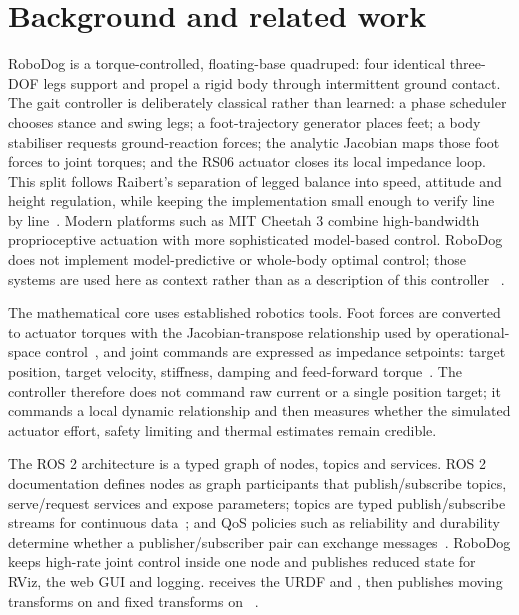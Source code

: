 \documentclass[11pt,a4paper]{article}
\begin{document}
\section{Background and related work}
\label{sec:scientific-framing}

RoboDog is a torque-controlled, floating-base quadruped: four identical
three-DOF legs support and propel a rigid body through intermittent ground
contact. The gait controller is deliberately classical rather than learned:
a phase scheduler chooses stance and swing legs; a foot-trajectory generator
places feet; a body stabiliser requests ground-reaction forces; the analytic
Jacobian maps those foot forces to joint torques; and the RS06 actuator closes
its local impedance loop. This split follows Raibert's separation of legged
balance into speed, attitude and height regulation, while keeping the
implementation small enough to verify line by line~\cite{raibert,raibert-darpa}.
Modern platforms such as MIT Cheetah 3 combine high-bandwidth proprioceptive
actuation with more sophisticated model-based control. RoboDog does not
implement model-predictive or whole-body optimal control; those systems are
used here as context rather than as a description of this controller
~\cite{cheetah3-design,mpc-wbic}.

The mathematical core uses established robotics tools. Foot forces are
converted to actuator torques with the Jacobian-transpose relationship used by
operational-space control~\cite{khatib},
and joint commands are expressed as impedance setpoints: target position,
target velocity, stiffness, damping and feed-forward torque~\cite{hogan}. The controller therefore does
not command raw current or a single position target; it commands a local
dynamic relationship and then measures whether the simulated actuator effort,
safety limiting and thermal estimates remain credible.

The ROS 2 architecture is a typed graph of nodes, topics and services. ROS 2
documentation defines nodes as graph participants that publish/subscribe
topics, serve/request services and expose parameters; topics are typed
publish/subscribe streams for continuous data~\cite{ros2-nodes,ros2-topics};
and QoS policies such as reliability and durability determine whether a
publisher/subscriber pair can exchange messages~\cite{ros2-qos}.
RoboDog keeps high-rate joint control inside one node and publishes reduced
state for RViz, the web GUI and logging. 
receives the URDF and , then publishes moving transforms
on  and fixed transforms on ~\cite{robot-state-publisher}.
\end{document}
